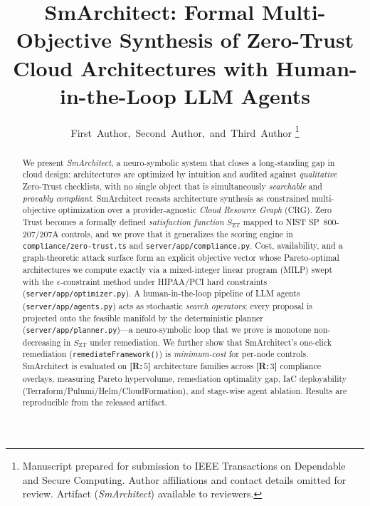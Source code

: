 \documentclass[journal]{IEEEtran}
\newif\ifdraft\drafttrue   %
\newcommand{\result}[1]{\ifdraft\textcolor{resultblue}{\textbf{[R:\,#1]}}\else#1\fi}
\theoremstyle{plain}
\theoremstyle{definition}
\newcommand{\Szt}{S_{\mathrm{ZT}}}
\newcommand{\code}[1]{\texttt{\small #1}}
\begin{document}
\title{SmArchitect: Formal Multi-Objective Synthesis of Zero-Trust Cloud
Architectures with Human-in-the-Loop LLM Agents}

\author{First~Author,~Second~Author,~and~Third~Author%
\thanks{Manuscript prepared for submission to IEEE Transactions on Dependable
and Secure Computing. Author affiliations and contact details omitted for
review. Artifact (\emph{SmArchitect}) available to reviewers.}}


\maketitle

\begin{abstract}
We present \emph{SmArchitect}, a neuro-symbolic system that closes a
long-standing gap in cloud design: architectures are optimized by intuition and
audited against \emph{qualitative} Zero-Trust checklists, with no single object
that is simultaneously \emph{searchable} and \emph{provably compliant}. SmArchitect
recasts architecture synthesis as constrained multi-objective optimization over a
provider-agnostic \emph{Cloud Resource Graph} (CRG). Zero Trust becomes a formally
defined \emph{satisfaction function} $\Szt$ mapped to NIST SP~800-207/207A controls,
and we prove that it generalizes the scoring engine in
\code{compliance/zero-trust.ts} and \code{server/app/compliance.py}. Cost,
availability, and a graph-theoretic attack surface form an explicit objective
vector whose Pareto-optimal architectures we compute exactly via a mixed-integer
linear program (MILP) swept with the $\varepsilon$-constraint method under
HIPAA/PCI hard constraints (\code{server/app/optimizer.py}). A human-in-the-loop
pipeline of LLM agents (\code{server/app/agents.py}) acts as stochastic
\emph{search operators}; every proposal is projected onto the feasible manifold
by the deterministic planner (\code{server/app/planner.py})---a neuro-symbolic
loop that we prove is monotone non-decreasing in $\Szt$ under remediation. We
further show that SmArchitect's one-click remediation
(\code{remediateFramework()}) is \emph{minimum-cost} for per-node controls.
SmArchitect is evaluated on \result{$5$} architecture families across
\result{$3$} compliance overlays, measuring Pareto hypervolume, remediation
optimality gap, IaC deployability (Terraform/Pulumi/Helm/CloudFormation), and
stage-wise agent ablation. Results are reproducible from the released artifact.
\end{abstract}
\end{document}
